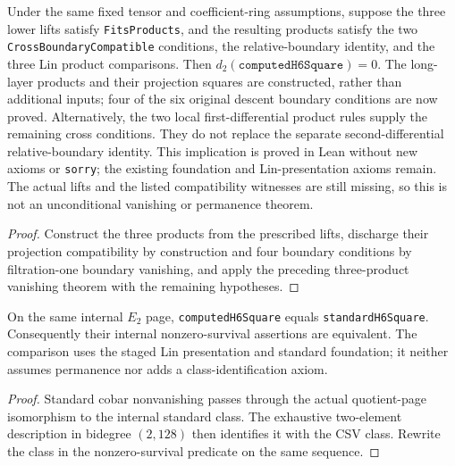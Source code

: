 \begin{proposition}
  \label{prop:h6-d2-zero-from-boundary-lifts}
  \notready
  Under the same fixed tensor and coefficient-ring assumptions, suppose
  the three lower lifts satisfy \texttt{FitsProducts}, and the resulting
  products satisfy the two \texttt{CrossBoundaryCompatible} conditions, the relative-boundary
  identity, and the three Lin product comparisons. Then
  $d_2(\texttt{computedH6Square})=0$. The long-layer products and their
  projection squares are constructed, rather than additional inputs;
  four of the six original descent boundary conditions are now proved.
  Alternatively, the two local first-differential product rules supply
  the remaining cross conditions. They do not replace the separate
  second-differential relative-boundary identity.
  This implication is proved in Lean without new axioms or \texttt{sorry};
  the existing foundation and Lin-presentation axioms remain. The actual
  lifts and the listed compatibility witnesses are still missing, so this
  is not an unconditional vanishing or permanence theorem.
\end{proposition}
\begin{proof}
  Construct the three products from the prescribed lifts, discharge their
  projection compatibility by construction and four boundary conditions
  by filtration-one boundary vanishing, and apply the preceding
  three-product vanishing theorem with the remaining hypotheses.
\end{proof}

\begin{proposition}
  \label{prop:h6-internal-standard-comparison}
  \notready
  On the same internal $E_2$ page,
  \texttt{computedH6Square} equals \texttt{standardH6Square}.
  Consequently their internal nonzero-survival assertions are equivalent.
  The comparison uses the staged Lin presentation and standard foundation;
  it neither assumes permanence nor adds a class-identification axiom.
\end{proposition}
\begin{proof}
  Standard cobar nonvanishing passes through the actual quotient-page
  isomorphism to the internal standard class. The exhaustive two-element
  description in bidegree $(2,128)$ then identifies it with the CSV class.
  Rewrite the class in the nonzero-survival predicate on the same sequence.
\end{proof}

